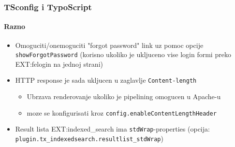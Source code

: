 %
%

\begin{frame}[fragile]
	\frametitle{TSconfig i TypoScript}
	\framesubtitle{Razno}

	\begin{itemize}

		\item Omoguciti/onemoguciti "forgot password" link uz pomoc opcije \small\texttt{showForgotPassword}\normalsize\newline
			(korisno ukoliko je ukljuceno vise login formi preko EXT:felogin na jednoj strani)

		\item HTTP response je sada ukljucen u zaglavlje \texttt{Content-length}

			\begin{itemize}
				\item Ubrzava renderovanje ukoliko je pipelining omogucen u Apache-u
				\item moze se konfigurisati kroz \texttt{config.enableContentLengthHeader}
			\end{itemize}

		\item Result lista EXT:indexed\_search ima \texttt{stdWrap}-properties\newline
			(opcija: \texttt{plugin.tx\_indexedsearch.resultlist\_stdWrap})

	\end{itemize}

\end{frame}


